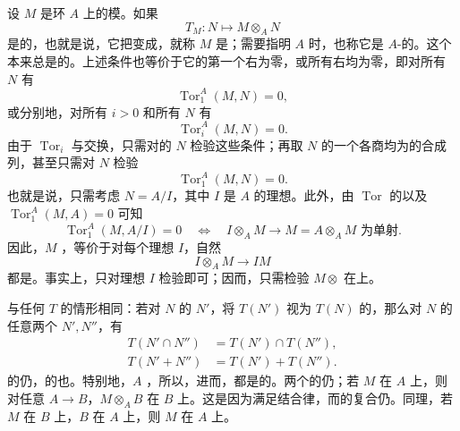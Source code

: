设 $M$ 是环 $A$ 上的模。如果
\[
T_M:N\longmapsto M\otimes_A N
\]
是的，也就是说，它把变成，就称 $M$ 是；需要指明 $A$ 时，也称它是 $A$-的。这个本来总是的。上述条件也等价于它的第一个右为零，或所有右均为零，即对所有 $N$ 有
\[
\operatorname{Tor}_1^A(M,N)=0,
\]
或分别地，对所有 $i>0$ 和所有 $N$ 有
\[
\operatorname{Tor}_i^A(M,N)=0.
\]
由于 $\operatorname{Tor}_i$ 与交换，只需对的 $N$ 检验这些条件；再取 $N$ 的一个各商均为的合成列，甚至只需对 $N$ 检验
\[
\operatorname{Tor}_1^A(M,N)=0.
\]
也就是说，只需考虑 $N=A/I$，其中 $I$ 是 $A$ 的理想。此外，由 $\operatorname{Tor}$ 的以及 $\operatorname{Tor}_1^A(M,A)=0$ 可知
\[
\operatorname{Tor}_1^A(M,A/I)=0
\quad\Longleftrightarrow\quad
I\otimes_A M\longrightarrow M=A\otimes_A M\text{ 为单射}.
\]
因此，$M$ ，等价于对每个理想 $I$，自然
\[
I\otimes_A M\longrightarrow IM
\]
都是。事实上，只对理想 $I$ 检验即可；因而，只需检验 $M\otimes$ 在上。

与任何 $T$ 的情形相同：若对 $N$ 的 $N'$，将 $T(N')$ 视为 $T(N)$ 的，那么对 $N$ 的任意两个 $N',N''$，有
\[
\begin{aligned}
T(N'\cap N'')&=T(N')\cap T(N''),\\
T(N'+N'')&=T(N')+T(N'').
\end{aligned}
\]
的仍，的也。特别地，$A$ ，所以，进而，都是的。两个的仍；若 $M$ 在 $A$ 上，则对任意 $A\to B$，$M\otimes_A B$ 在 $B$ 上。这是因为满足结合律，而的复合仍。同理，若 $M$ 在 $B$ 上，$B$ 在 $A$ 上，则 $M$ 在 $A$ 上。

